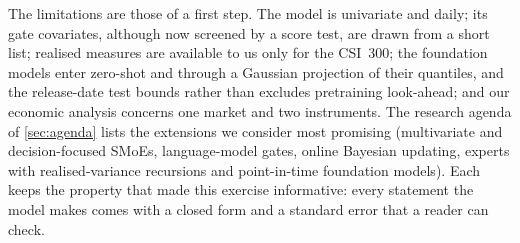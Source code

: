 The limitations are those of a first step. The model is univariate and daily; its gate covariates,
although now screened by a score test, are drawn from a short list; realised measures are available
to us only for the CSI~300; the foundation models enter zero-shot and through a Gaussian projection of
their quantiles, and the release-date test bounds rather than excludes pretraining look-ahead; and our
economic analysis concerns one market and two instruments. The research agenda of \cref{sec:agenda}
lists the extensions we consider most promising (multivariate and decision-focused SMoEs,
language-model gates, online Bayesian updating, experts with realised-variance recursions and
point-in-time foundation models). Each keeps the property that made this exercise informative: every
statement the model makes comes with a closed form and a standard error that a reader can check.

